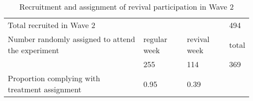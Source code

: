 \begin{table}[ht]
\centering
\caption{Recruitment and assignment of revival participation in Wave 2} 
\label{revival_experiment_summary}
\begin{tabular}{p{10cm}lll}
  \hline
  \hline
Total recruited in Wave 2 &  &  & 494 \\ 
  Number randomly assigned to attend the experiment & regular week & revival week & total \\ 
   & 255 & 114 & 369 \\ 
  Proportion complying with treatment assignment & 0.95 & 0.39 &  \\ 
   \hline
\end{tabular}
\end{table}

